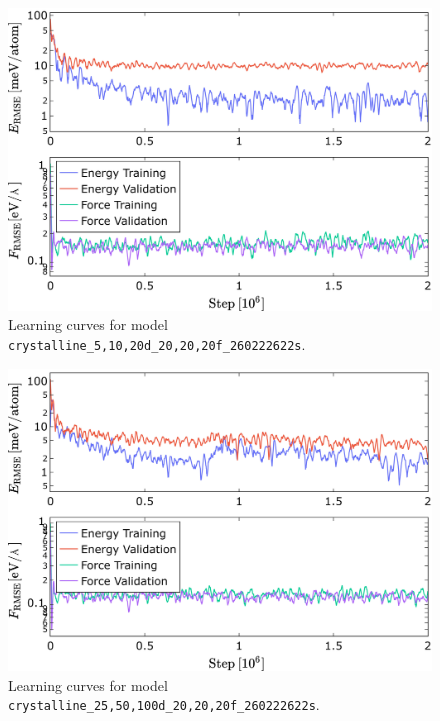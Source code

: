 \begin{figure}
  \begin{center}
    \includegraphics[width=.8\textwidth]{
      asset/crystalline_5,10,20d_20,20,20f_260222622s_energy_force_l_curve.jpg
    }
  \end{center}
  \caption{Learning curves for model \texttt{crystalline\_5,10,20d\_20,20,\allowbreak{}20f\_260222622s}.}
  \label{fig:crystalline_5,10,20d_20,20,20f_260222622s-learning-curves}
\end{figure}

\begin{figure}
  \begin{center}
    \includegraphics[width=.8\textwidth]{
      asset/crystalline_25,50,100d_20,20,20f_260222622s_energy_force_l_curve.jpg
    }
  \end{center}
  \caption{Learning curves for model \texttt{crystalline\_25,50,100d\_20,20,\allowbreak{}20f\_260222622s}.}
  \label{fig:crystalline_25,50,100d_20,20,20f_260222622s-learning-curves}
\end{figure}

